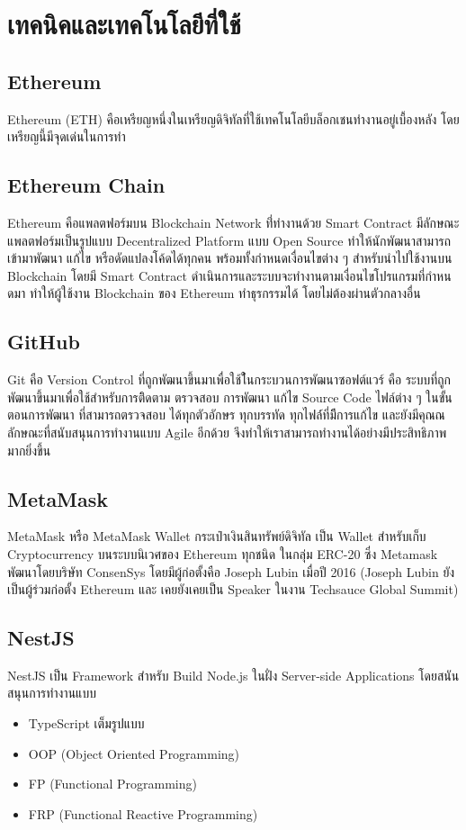 \documentclass[12pt,oneside,openright,a4paper]{cpe-thai-project}
\begin{document}
\section{เทคนิคและเทคโนโลยีที่ใช้}
\subsection{Ethereum} 
\tab Ethereum (ETH) คือเหรียญหนึ่งในเหรียญดิจิทัลที่ใช้เทคโนโลยีบล็อกเชนทำงานอยู่เบื้องหลัง โดยเหรียญนี้มีจุดเด่นในการทำ
\subsection{Ethereum Chain} 
\tab Ethereum คือแพลตฟอร์มบน Blockchain Network ที่่ทํางานด้วย Smart Contract มีลักษณะแพลตฟอร์มเป็นรูปแบบ Decentralized Platform แบบ Open Source ทําให้นักพัฒนาสามารถเข้ามาพัฒนา แก้ไข หรือดัดแปลงโค้ดได้ทุกคน พร้อมทั้งกําหนดเงื่อนไขต่าง ๆ สําหรับนําไปใช้งานบน Blockchain โดยมี Smart Contract ดําเนินการและระบบจะทํางานตามเงื่อนไขโปรแกรมที่กําหนดมา ทําให้ผู้ใช้งาน Blockchain ของ Ethereum ทําธุรกรรมได้ โดยไม่ต้องผ่านตัวกลางอื่น
\subsection{GitHub}
\tab Git คือ Version Control ที่ถูกพัฒนาขึ้นมาเพื่อใช้ใ้นกระบวนการพัฒนาซอฟต์แวร์ คือ ระบบที่ถูกพัฒนาขึ้นมาเพื่อใช้สำหรับการติิดตาม ตรวจสอบ การพัฒนา แก้ไข Source Code ไฟล์ต่าง ๆ ในขั้นตอนการพัฒนา ที่สามารถตรวจสอบ ได้ทุกตัวอักษร ทุกบรรทัด ทุกไฟล์์ที่มีีการแก้ไข และยังมีคุณณลักษณะที่สนับสนุนการทำงานแบบ Agile อีกด้วย จึงทำให้เราสามารถทำงานได้อย่างมีประสิทธิภาพมากยิ่งขึ้น
\subsection{MetaMask}
\tab MetaMask หรือ MetaMask Wallet กระเป๋าเงินสินทรัพย์ดิจิทัล เป็น Wallet สำหรับเก็บ Cryptocurrency บนระบบนิเวศของ Ethereum ทุกชนิด ในกลุ่ม ERC-20 ซึ่ง Metamask พัฒนาโดยบริษัท ConsenSys โดยมีผู้ก่อตั้งคือ Joseph Lubin เมื่อปี 2016 (Joseph Lubin ยังเป็นผู้ร่วมก่อตั้ง Ethereum และ เคยยังเคยเป็น Speaker ในงาน Techsauce Global Summit)
\subsection{NestJS}
\tab NestJS เป็น Framework สำหรับ Build Node.js ในฝั่ง Server-side Applications โดยสนันสนุนการทำงานแบบ
	\begin{itemize}[leftmargin=0pt,itemindent=2.5cm]
		\item TypeScript เต็มรูปแบบ
		\item OOP (Object Oriented Programming)
		\item FP (Functional Programming)
		\item FRP (Functional Reactive Programming)
	\end{itemize}
\end{document}

